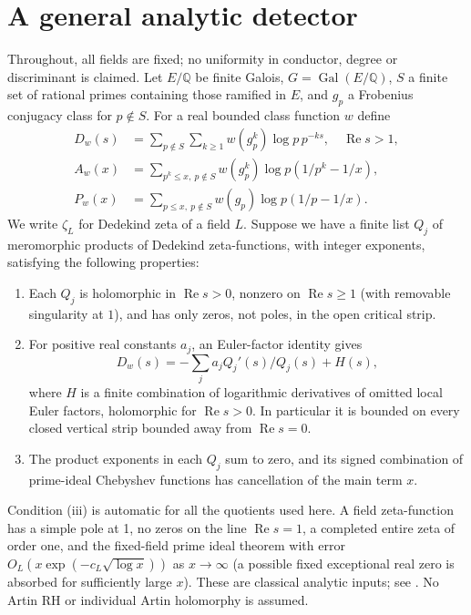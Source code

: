 \documentclass[11pt]{article}
\theoremstyle{remark}\newtheorem{remark}[theorem]{Remark}
\newcommand{\Q}{\mathbb Q}\newcommand{\C}{\mathbb C}\newcommand{\R}{\mathbb R}\newcommand{\ind}{\mathbf 1}\newcommand{\ord}{\operatorname{ord}}\newcommand{\Rea}{\operatorname{Re}}
\begin{document}
\section{A general analytic detector}
Throughout, all fields are fixed; no uniformity in conductor, degree or discriminant is claimed. Let $E/\Q$ be finite Galois, $G=\operatorname{Gal}(E/\Q)$, $S$ a finite set of rational primes containing those ramified in $E$, and $g_p$ a Frobenius conjugacy class for $p\notin S$. For a real bounded class function $w$ define
\begin{align*}
D_w(s)&=\sum_{p\notin S}\sum_{k\ge1}w(g_p^k)\log p\,p^{-ks},\quad \Rea s>1,\\
A_w(x)&=\sum_{p^k\le x,\ p\notin S}w(g_p^k)\log p(1/p^k-1/x),\\
P_w(x)&=\sum_{p\le x,\ p\notin S}w(g_p)\log p(1/p-1/x).
\end{align*}
We write $\zeta_L$ for Dedekind zeta of a field $L$. Suppose we have a finite list $Q_j$ of meromorphic products of Dedekind zeta-functions, with integer exponents, satisfying the following properties:
\begin{enumerate}[label=(\roman*)]
\item Each $Q_j$ is holomorphic in $\Rea s>0$, nonzero on $\Rea s\ge1$ (with removable singularity at $1$), and has only zeros, not poles, in the open critical strip.
\item For positive real constants $a_j$, an Euler-factor identity gives
\begin{equation}\label{eq:identity}
D_w(s)=-\sum_j a_j Q_j'(s)/Q_j(s)+H(s),
\end{equation}
where $H$ is a finite combination of logarithmic derivatives of omitted local Euler factors, holomorphic for $\Rea s>0$. In particular it is bounded on every closed vertical strip bounded away from $\Rea s=0$.
\item The product exponents in each $Q_j$ sum to zero, and its signed combination of prime-ideal Chebyshev functions has cancellation of the main term $x$.
\end{enumerate}
Condition (iii) is automatic for all the quotients used here. A field zeta-function has a simple pole at 1, no zeros on the line $\Rea s=1$, a completed entire zeta of order one, and the fixed-field prime ideal theorem with error $O_L(x\exp(-c_L\sqrt{\log x}))$ as $x\to\infty$ (a possible fixed exceptional real zero is absorbed for sufficiently large $x$). These are classical analytic inputs; see \cite{neukirch,montgomery,grenier}. No Artin RH or individual Artin holomorphy is assumed.
\end{document}
